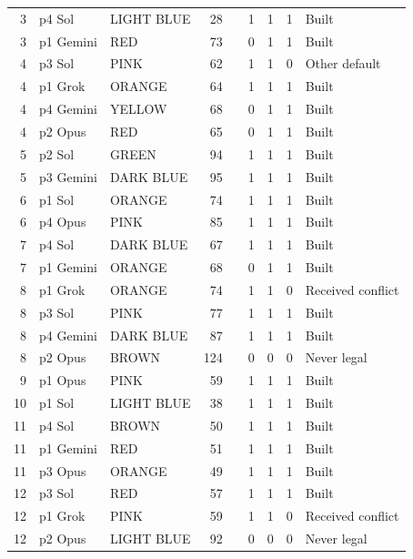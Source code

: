 \begin{longtable}{r l l r l r r r L{1.45in}}
3 & p4 Sol & LIGHT BLUE & 28 &  & 1 & 1 & 1 & Built \\
3 & p1 Gemini & RED & 73 &  & 0 & 1 & 1 & Built \\
4 & p3 Sol & PINK & 62 &  & 1 & 1 & 0 & Other default \\
4 & p1 Grok & ORANGE & 64 &  & 1 & 1 & 1 & Built \\
4 & p4 Gemini & YELLOW & 68 &  & 0 & 1 & 1 & Built \\
4 & p2 Opus & RED & 65 &  & 0 & 1 & 1 & Built \\
5 & p2 Sol & GREEN & 94 &  & 1 & 1 & 1 & Built \\
5 & p3 Gemini & DARK BLUE & 95 &  & 1 & 1 & 1 & Built \\
6 & p1 Sol & ORANGE & 74 &  & 1 & 1 & 1 & Built \\
6 & p4 Opus & PINK & 85 &  & 1 & 1 & 1 & Built \\
7 & p4 Sol & DARK BLUE & 67 &  & 1 & 1 & 1 & Built \\
7 & p1 Gemini & ORANGE & 68 &  & 0 & 1 & 1 & Built \\
8 & p1 Grok & ORANGE & 74 &  & 1 & 1 & 0 & Received conflict \\
8 & p3 Sol & PINK & 77 &  & 1 & 1 & 1 & Built \\
8 & p4 Gemini & DARK BLUE & 87 &  & 1 & 1 & 1 & Built \\
8 & p2 Opus & BROWN & 124 &  & 0 & 0 & 0 & Never legal \\
9 & p1 Opus & PINK & 59 &  & 1 & 1 & 1 & Built \\
10 & p1 Sol & LIGHT BLUE & 38 &  & 1 & 1 & 1 & Built \\
11 & p4 Sol & BROWN & 50 &  & 1 & 1 & 1 & Built \\
11 & p1 Gemini & RED & 51 &  & 1 & 1 & 1 & Built \\
11 & p3 Opus & ORANGE & 49 &  & 1 & 1 & 1 & Built \\
12 & p3 Sol & RED & 57 &  & 1 & 1 & 1 & Built \\
12 & p1 Grok & PINK & 59 &  & 1 & 1 & 0 & Received conflict \\
12 & p2 Opus & LIGHT BLUE & 92 &  & 0 & 0 & 0 & Never legal \\

\end{longtable}
